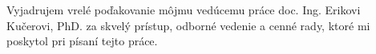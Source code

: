Vyjadrujem vrelé poďakovanie môjmu vedúcemu práce doc. Ing. Erikovi Kučerovi, PhD. za skvelý prístup, odborné vedenie a cenné rady, ktoré mi poskytol pri písaní tejto práce.
